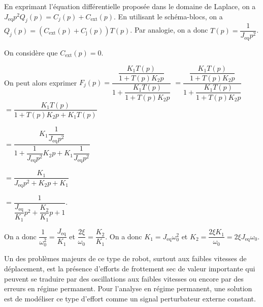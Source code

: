 \ifprof
\begin{corrige}
En exprimant l'équation différentielle proposée dans le domaine de Laplace, on a 
$J_{\text{eq}} p^2{Q}_j(p)=C_j(p)+C_{\text{ext}}(p)$.
En utilisant le schéma-blocs, on a $Q_j(p)=\left(C_{\text{ext}}(p)+C_{\text{j}}(p)\right)T(p)$. 
Par analogie, on a donc $T(p)=\dfrac{1}{J_{\text{eq}}p^2}$.

On considère que $C_{\text{ext}}(p)=0$.  

On peut alors exprimer 
$F_j(p)= \dfrac{\dfrac{K_1T(p)}{1+T(p)K_2 p} }{1+\dfrac{K_1T(p)}{1+T(p)K_2 p}}$
$= \dfrac{\dfrac{K_1T(p)}{1+T(p)K_2 p} }{1+\dfrac{K_1T(p)}{1+T(p)K_2 p}}$
$= \dfrac{K_1T(p) }{1+T(p)K_2 p+K_1T(p)}$

$= \dfrac{K_1\dfrac{1}{J_{\text{eq}}p^2}}{1+\dfrac{1}{J_{\text{eq}}p^2}K_2 p+K_1\dfrac{1}{J_{\text{eq}}p^2}}$

$= \dfrac{K_1}{J_{\text{eq}}p^2+K_2 p+K_1}$

$= \dfrac{1}{\dfrac{J_{\text{eq}}}{K_1}p^2+\dfrac{K_2}{K_1}p+1}$.

On a donc $\dfrac{1}{\omega_0^2}=\dfrac{J_{\text{eq}}}{K_1}$ et $\dfrac{2\xi}{\omega_0}=\dfrac{K_2}{K_1}$. On a donc $K_1=J_{\text{eq}}\omega_0^2$ et $K_2=\dfrac{2\xi K_1}{\omega_0}=2\xi J_{\text{eq}}\omega_0$.
\end{corrige}
\else
\fi


Un des problèmes majeurs de ce type de robot, surtout aux faibles vitesses de déplacement, est la présence d'efforts de frottement sec de valeur importante qui peuvent se traduire par des oscillations aux faibles vitesses ou encore par des erreurs en régime permanent. Pour l'analyse en régime permanent, une solution est de modéliser ce type d'effort comme un signal perturbateur externe constant.\\


